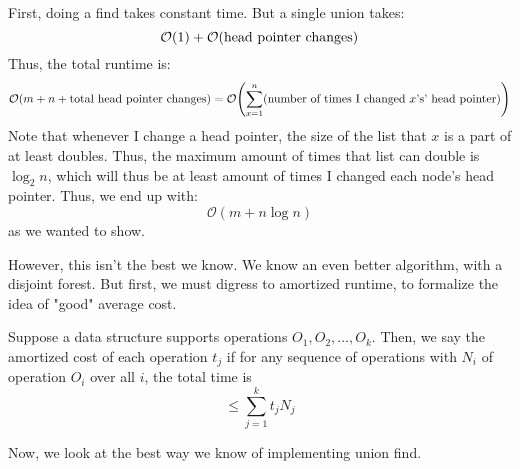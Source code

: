 \begin{proof*}
    First, doing a find takes constant time. But a single union takes:
    \[ \operatorname{\mathcal{O}}(1) + \operatorname{\mathcal{O}}(\text{head pointer changes}) \]
    Thus, the total runtime is:
    \[ \mathcal{O}(m + n + \text{total head pointer changes}) = \mathcal{O}\qty(\sum_{x = 1}^n (\text{number of times I changed $x$'s' head pointer})) \]
    Note that whenever I change a head pointer, the size of the list that $x$ is a part of at least doubles.
    Thus, the maximum amount of times that list can double is $\log_2 n$, which will thus be at least amount of times I changed each node's head pointer.
    Thus, we end up with:
    \[ \mathcal{O}(m + n\log n) \]
    as we wanted to show.
\end{proof*}

However, this isn't the best we know. We know an even better algorithm, with
a disjoint forest. But first, we must digress to amortized runtime, to formalize
the idea of "good" average cost.

\begin{definition}
    Suppose a data structure supports operations $O_1, O_2, \dots, O_k$.
    Then, we say the amortized cost of each operation $t_j$ if for
    any sequence of operations with $N_i$ of operation $O_i$ over all $i$, the total time
    is
    \[ \leq \sum_{j = 1}^k t_j N_j \]
\end{definition}

Now, we look at the best way we know of implementing union find.

